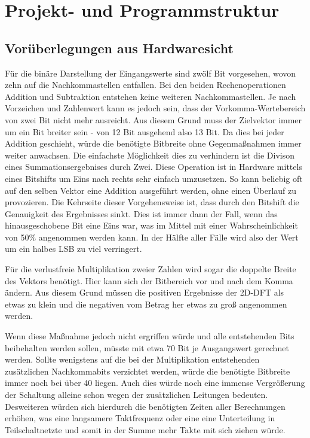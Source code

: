 

\section{Projekt- und Programmstruktur}
 \subsection{Vorüberlegungen aus Hardwaresicht}
 Für die binäre Darstellung der Eingangswerte sind zwölf Bit vorgesehen, wovon zehn auf die 
 Nachkommastellen entfallen. Bei den beiden Rechenoperationen Addition und Subtraktion
 entstehen keine weiteren Nachkommastellen. Je nach Vorzeichen und Zahlenwert kann es jedoch sein,
 dass der Vorkomma-Wertebereich von zwei Bit nicht mehr ausreicht. Aus diesem Grund muss der Zielvektor
  immer um ein Bit breiter sein - von 12 Bit ausgehend also 13 Bit.
  Da dies bei jeder Addition geschieht, würde die benötigte Bitbreite ohne Gegenmaßnahmen immer 
  weiter anwachsen. Die einfachste Möglichkeit dies zu verhindern ist die Divison eines Summationsergebnises
  durch Zwei. Diese Operation ist in Hardware mittels eines Bitshifts um Eins nach rechts sehr einfach
  umzusetzen.
  So kann beliebig oft auf den selben Vektor eine Addition ausgeführt werden, ohne einen Überlauf zu provozieren.
  Die Kehrseite dieser Vorgehensweise ist, dass durch den Bitshift die Genauigkeit des Ergebnisses sinkt.
  Dies ist immer dann der Fall, wenn das hinausgeschobene Bit eine Eins war, was im Mittel mit
  einer Wahrscheinlichkeit von 50$\%$ angenommen werden kann.
  In der Hälfte aller Fälle wird also der Wert um ein halbes LSB zu viel verringert. 
    
  Für die verlustfreie Multiplikation zweier Zahlen wird sogar die doppelte Breite des Vektors 
  benötigt. Hier kann sich der Bitbereich vor und nach dem Komma ändern.
  Aus diesem Grund müssen die positiven Ergebnisse der 2D-DFT als etwas zu klein und
  die negativen vom Betrag her etwas zu groß angenommen werden.
  
  Wenn diese Maßnahme jedoch nicht ergriffen würde und alle entstehenden Bits beibehalten 
  werden sollen, müsste mit etwa 70 Bit je Ausgangswert gerechnet werden. Sollte wenigstens
  auf die bei der Multiplikation entstehenden zusätzlichen Nachkommabits verzichtet werden, 
  würde die benötigte Bitbreite immer noch bei über 40 liegen.
  Auch dies würde noch eine immense Vergrößerung der Schaltung alleine schon wegen der zusätzlichen
  Leitungen bedeuten. Desweiteren würden sich hierdurch die benötigten Zeiten aller Berechnungen erhöhen, 
  was eine langsamere Taktfrequenz oder eine eine Unterteilung in Teilschaltnetzte und somit in der Summe
  mehr Takte mit sich ziehen würde.
  




